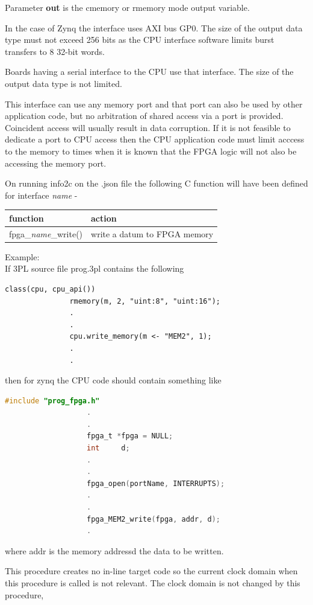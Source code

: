             Parameter {\bf out} is the cmemory or rmemory mode output variable.

            
            In the case of Zynq the interface uses AXI bus GP0.            
            The size of the output data type must not exceed 256 bits as the CPU
            interface software limits burst transfers to 8 32-bit words.
            
            Boards having a serial interface to the CPU use that interface.
            The size of the output data type is not limited.
            
            This interface can use any memory port and that port can also be
            used by other application code, but no arbitration of shared access
            via a port is provided. Coincident access will usually result in
            data corruption. If it is not feasible to dedicate a port to CPU
            access then the CPU application code must limit acccess to the
            memory to times when it is known that the FPGA logic will not also
            be accessing the memory port.
            
            On running info2c on the .json file the following C function will have been
            defined for interface {\em name} -
            
            \begin{tabular}{| l | l |}
            \hline
            function                   & action                       \\ \hline \hline
            fpga\_{\em name}\_write()  & write a datum to FPGA memory \\ \hline
            \end{tabular}
            
            Example: \\
            If 3PL source file prog.3pl contains the following \\
            \begin{lstlisting}[gobble=12, language=threepl]
               class(cpu, cpu_api())
               rmemory(m, 2, "uint:8", "uint:16");
               .
               .
               cpu.write_memory(m <- "MEM2", 1);
               .
               .
            \end{lstlisting}
            then for zynq the CPU code should contain something like \\
            \begin{lstlisting}[gobble=12, language=C]
                   #include "prog_fpga.h"
                   .
                   .
                   fpga_t *fpga = NULL;
                   int     d;
                   .
                   .
                   fpga_open(portName, INTERRUPTS);
                   .
                   .
                   fpga_MEM2_write(fpga, addr, d);
                   .
            \end{lstlisting}
            where addr is the memory addressd the data to be written.

            This procedure creates no in-line target code so the current clock domain
            when this procedure is called is not relevant. The clock domain is not
            changed by this procedure,
